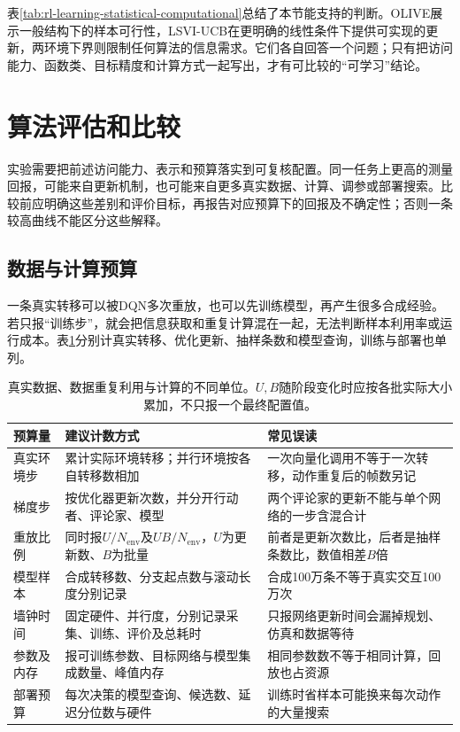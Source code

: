 表\ref{tab:rl-learning-statistical-computational}总结了本节能支持的判断。OLIVE展示一般结构下的样本可行性，LSVI-UCB在更明确的线性条件下提供可实现的更新，两环境下界则限制任何算法的信息需求。它们各自回答一个问题；只有把访问能力、函数类、目标精度和计算方式一起写出，才有可比较的“可学习”结论。

\section{算法评估和比较}
\label{sec:rl-learning-evaluation}

实验需要把前述访问能力、表示和预算落实到可复核配置。同一任务上更高的测量回报，可能来自更新机制，也可能来自更多真实数据、计算、调参或部署搜索。比较前应明确这些差别和评价目标，再报告对应预算下的回报及不确定性；否则一条较高曲线不能区分这些解释。

\subsection{数据与计算预算}
\label{sec:rl-learning-budget}

一条真实转移可以被DQN多次重放，也可以先训练模型，再产生很多合成经验。若只报“训练步”，就会把信息获取和重复计算混在一起，无法判断样本利用率或运行成本。表\ref{tab:rl-learning-budget-units}分别计真实转移、优化更新、抽样条数和模型查询，训练与部署也单列。

\begin{table}[t]
  \centering
  \small
  \begin{tabularx}{\linewidth}{>{\raggedright\arraybackslash}p{27mm} >{\raggedright\arraybackslash}X >{\raggedright\arraybackslash}X}
    \toprule
    预算量 & 建议计数方式 & 常见误读 \\
    \midrule
    真实环境步 & 累计实际环境转移；并行环境按各自转移数相加 & 一次向量化调用不等于一次转移，动作重复后的帧数另记 \\
    梯度步 & 按优化器更新次数，并分开行动者、评论家、模型 & 两个评论家的更新不能与单个网络的一步含混合计 \\
    重放比例 & 同时报$U/N_{\mathrm{env}}$及$UB/N_{\mathrm{env}}$，$U$为更新数、$B$为批量 & 前者是更新次数比，后者是抽样条数比，数值相差$B$倍 \\
    模型样本 & 合成转移数、分支起点数与滚动长度分别记录 & 合成100万条不等于真实交互100万次 \\
    墙钟时间 & 固定硬件、并行度，分别记录采集、训练、评价及总耗时 & 只报网络更新时间会漏掉规划、仿真和数据等待 \\
    参数及内存 & 报可训练参数、目标网络与模型集成数量、峰值内存 & 相同参数数不等于相同计算，回放也占资源 \\
    部署预算 & 每次决策的模型查询、候选数、延迟分位数与硬件 & 训练时省样本可能换来每次动作的大量搜索 \\
    \bottomrule
  \end{tabularx}
  \caption{真实数据、数据重复利用与计算的不同单位。$U,B$随阶段变化时应按各批实际大小累加，不只报一个最终配置值。}
  \label{tab:rl-learning-budget-units}
\end{table}

